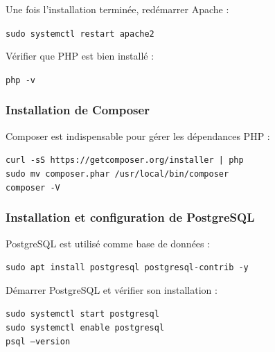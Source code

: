 Une fois l’installation terminée, redémarrer Apache :

\begin{tcolorbox}[colback=black, coltext=white, title=Redémarrage du serveur Apache, fonttitle=\bfseries]
\texttt{sudo systemctl restart apache2}
\end{tcolorbox}

Vérifier que PHP est bien installé :

\begin{tcolorbox}[colback=black, coltext=white, title=Vérification de la version de PHP, fonttitle=\bfseries]
\texttt{php -v}
\end{tcolorbox}

\subsubsection*{Installation de Composer}
Composer est indispensable pour gérer les dépendances PHP :

\begin{tcolorbox}[colback=black, coltext=white, title=Installation de Composer, fonttitle=\bfseries]
\texttt{curl -sS https://getcomposer.org/installer | php} \\
\texttt{sudo mv composer.phar /usr/local/bin/composer} \\
\texttt{composer -V}
\end{tcolorbox}

\subsubsection{Installation et configuration de PostgreSQL}
PostgreSQL est utilisé comme base de données :

\begin{tcolorbox}[colback=black, coltext=white, title=Installation de PostgreSQL, fonttitle=\bfseries]
\texttt{sudo apt install postgresql postgresql-contrib -y}
\end{tcolorbox}

Démarrer PostgreSQL et vérifier son installation :

\begin{tcolorbox}[colback=black, coltext=white, title=Démarrage et vérification, fonttitle=\bfseries]
\texttt{sudo systemctl start postgresql} \\
\texttt{sudo systemctl enable postgresql} \\
\texttt{psql --version}
\end{tcolorbox}


